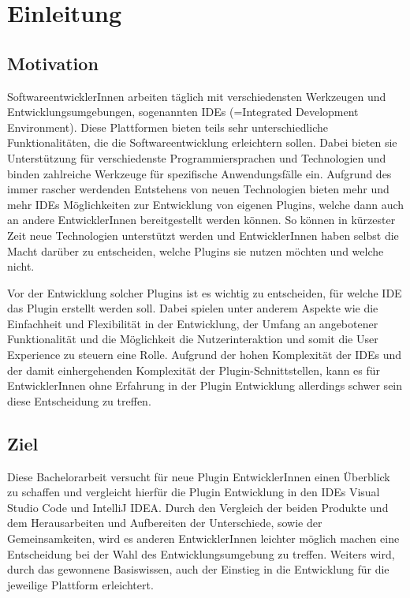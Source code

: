 \chapter{Einleitung}
\label{cha:Einleitung}


\section{Motivation}
\label{sec:Motivation}

SoftwareentwicklerInnen arbeiten täglich mit verschiedensten 
Werkzeugen und Entwicklungsumgebungen, sogenannten IDEs 
(=Integrated Development Environment). Diese Plattformen 
bieten teils sehr unterschiedliche Funktionalitäten, die 
die Softwareentwicklung erleichtern sollen. Dabei bieten 
sie Unterstützung für verschiedenste Programmiersprachen 
und Technologien und binden zahlreiche Werkzeuge für 
spezifische Anwendungsfälle ein. Aufgrund des immer rascher
werdenden Entstehens von neuen Technologien bieten mehr 
und mehr IDEs Möglichkeiten zur Entwicklung von eigenen 
Plugins, welche dann auch an andere EntwicklerInnen 
bereitgestellt werden können. So können in kürzester 
Zeit neue Technologien unterstützt werden und 
EntwicklerInnen haben selbst die Macht darüber zu 
entscheiden, welche Plugins sie nutzen möchten und 
welche nicht.

Vor der Entwicklung solcher Plugins ist es wichtig 
zu entscheiden, für welche IDE das Plugin erstellt 
werden soll. Dabei spielen unter anderem Aspekte wie 
die Einfachheit und Flexibilität in der Entwicklung, 
der Umfang an angebotener Funktionalität und die Möglichkeit
die Nutzerinteraktion und somit die User Experience 
zu steuern eine Rolle. Aufgrund der hohen 
Komplexität der IDEs und der damit einhergehenden 
Komplexität der Plugin-Schnittstellen, kann es für EntwicklerInnen
ohne Erfahrung in der Plugin Entwicklung allerdings schwer sein
diese Entscheidung zu treffen.

\section{Ziel}
\label{sec:Ziel}

Diese Bachelorarbeit versucht für neue Plugin EntwicklerInnen
einen Überblick zu schaffen und vergleicht hierfür 
die Plugin Entwicklung in den IDEs Visual Studio Code 
und IntelliJ IDEA. Durch den Vergleich der beiden Produkte 
und dem Herausarbeiten und Aufbereiten der Unterschiede, 
sowie der Gemeinsamkeiten, wird es anderen 
EntwicklerInnen leichter möglich machen eine Entscheidung
bei der Wahl des Entwicklungsumgebung zu treffen.
Weiters wird, durch das gewonnene Basiswissen, auch der Einstieg
in die Entwicklung für die jeweilige Plattform erleichtert.

